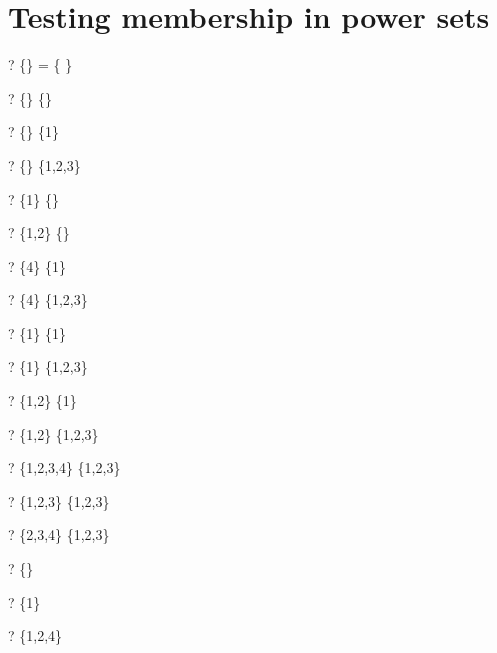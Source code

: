 \documentclass{article}
\begin{document}
\section{Testing membership in power sets}
\begin{zed} \vdash?  \power \{\} = \{ \emptyset \} \end{zed}
\begin{zed} \vdash?  \{\} \in \power \{\} \end{zed}
\begin{zed} \vdash?  \{\} \in \power \{1\} \end{zed}
\begin{zed} \vdash?  \{\} \in \power \{1,2,3\} \end{zed}
\begin{zed} \vdash?  \{1\} \notin \power \{\} \end{zed}
\begin{zed} \vdash?  \{1,2\} \notin \power \{\} \end{zed}
\begin{zed} \vdash?  \{4\} \notin \power \{1\} \end{zed}
\begin{zed} \vdash?  \{4\} \notin \power \{1,2,3\} \end{zed}
\begin{zed} \vdash?  \{1\} \in \power \{1\} \end{zed}
\begin{zed} \vdash?  \{1\} \in \power \{1,2,3\} \end{zed}
\begin{zed} \vdash?  \{1,2\} \notin \power \{1\} \end{zed}
\begin{zed} \vdash?  \{1,2\} \in \power \{1,2,3\} \end{zed}
\begin{zed} \vdash?  \{1,2,3,4\} \notin \power \{1,2,3\} \end{zed}
\begin{zed} \vdash?  \{1,2,3\} \in \power \{1,2,3\} \end{zed}
\begin{zed} \vdash?  \{2,3,4\} \notin \power \{1,2,3\} \end{zed}
\begin{zed} \vdash?  \{\} \in \power \nat \end{zed}
\begin{zed} \vdash?  \{1\} \in \power \nat \end{zed}
\begin{zed} \vdash?  \{1,2,4\} \in \power \nat \end{zed}
\end{document}
